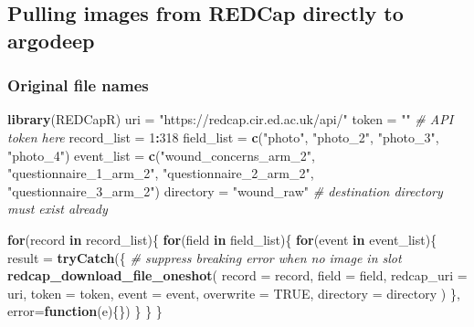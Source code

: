 \documentclass[]{book}
\newenvironment{Shaded}{\begin{snugshade}}{\end{snugshade}}
\newcommand{\CommentTok}[1]{\textcolor[rgb]{0.56,0.35,0.01}{\textit{#1}}}
\newcommand{\ControlFlowTok}[1]{\textcolor[rgb]{0.13,0.29,0.53}{\textbf{#1}}}
\newcommand{\DataTypeTok}[1]{\textcolor[rgb]{0.13,0.29,0.53}{#1}}
\newcommand{\DecValTok}[1]{\textcolor[rgb]{0.00,0.00,0.81}{#1}}
\newcommand{\KeywordTok}[1]{\textcolor[rgb]{0.13,0.29,0.53}{\textbf{#1}}}
\newcommand{\NormalTok}[1]{#1}
\newcommand{\OperatorTok}[1]{\textcolor[rgb]{0.81,0.36,0.00}{\textbf{#1}}}
\newcommand{\OtherTok}[1]{\textcolor[rgb]{0.56,0.35,0.01}{#1}}
\newcommand{\StringTok}[1]{\textcolor[rgb]{0.31,0.60,0.02}{#1}}
\theoremstyle{definition}
\theoremstyle{definition}
\theoremstyle{definition}
\theoremstyle{remark}
\begin{document}
\hypertarget{pulling-images-from-redcap-directly-to-argodeep}{%
\subsection{Pulling images from REDCap directly to
argodeep}\label{pulling-images-from-redcap-directly-to-argodeep}}

\hypertarget{original-file-names}{%
\subsubsection{Original file names}\label{original-file-names}}

\begin{Shaded}
\begin{Highlighting}[]
\KeywordTok{library}\NormalTok{(REDCapR)}
\NormalTok{uri =}\StringTok{ "https://redcap.cir.ed.ac.uk/api/"}
\NormalTok{token =}\StringTok{ ""} \CommentTok{# API token here}
\NormalTok{record_list =}\StringTok{ }\DecValTok{1}\OperatorTok{:}\DecValTok{318}
\NormalTok{field_list =}\StringTok{ }\KeywordTok{c}\NormalTok{(}\StringTok{"photo"}\NormalTok{, }\StringTok{"photo_2"}\NormalTok{, }\StringTok{"photo_3"}\NormalTok{, }\StringTok{"photo_4"}\NormalTok{)}
\NormalTok{event_list =}\StringTok{ }\KeywordTok{c}\NormalTok{(}\StringTok{"wound_concerns_arm_2"}\NormalTok{, }\StringTok{"questionnaire_1_arm_2"}\NormalTok{,}
               \StringTok{"questionnaire_2_arm_2"}\NormalTok{, }\StringTok{"questionnaire_3_arm_2"}\NormalTok{)}
\NormalTok{directory =}\StringTok{ "wound_raw"} \CommentTok{# destination directory must exist already}


\ControlFlowTok{for}\NormalTok{(record }\ControlFlowTok{in}\NormalTok{ record_list)\{}
  \ControlFlowTok{for}\NormalTok{(field }\ControlFlowTok{in}\NormalTok{ field_list)\{}
    \ControlFlowTok{for}\NormalTok{(event }\ControlFlowTok{in}\NormalTok{ event_list)\{}
\NormalTok{      result =}\StringTok{ }
\StringTok{        }\KeywordTok{tryCatch}\NormalTok{(\{      }\CommentTok{# suppress breaking error when no image in slot}
          \KeywordTok{redcap_download_file_oneshot}\NormalTok{(}
            \DataTypeTok{record        =}\NormalTok{ record,}
            \DataTypeTok{field         =}\NormalTok{ field,}
            \DataTypeTok{redcap_uri    =}\NormalTok{ uri,}
            \DataTypeTok{token         =}\NormalTok{ token,}
            \DataTypeTok{event         =}\NormalTok{ event,}
            \DataTypeTok{overwrite     =} \OtherTok{TRUE}\NormalTok{,}
            \DataTypeTok{directory     =}\NormalTok{ directory}
\NormalTok{          )}
\NormalTok{        \}, }\DataTypeTok{error=}\ControlFlowTok{function}\NormalTok{(e)\{\})}
\NormalTok{    \}}
\NormalTok{  \}}
\NormalTok{\}}
\end{Highlighting}
\end{Shaded}
\end{document}
